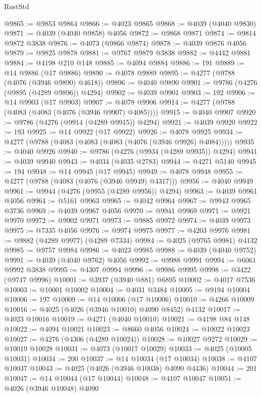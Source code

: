 \begin{lexlean}{RustStd}
\begin{coremodule}
@9865 := @9853 @9864
@9866 := @4023 @9865
@9868 := @4039 (@4040 @9830)
@9871 := @4039 (@4040 @9858) @4056
@9872 := @9868 @9871
@9874 := @9814 @9872 @3838
@9876 := @4073 (@9866 @9874)
@9878 := @4039 @9876 @4056
@9879 := @9825 @9878
@9881 := @9767 @9879 @3838
@9882 := @4442 @9881
@9884 := @4198 @210 @148
@9885 := @4094 @9884
@9886 := 191
@9889 := @14 @9886 (@17 @9886)
@9890 := @4078 @9889
@9895 := @4277 (@9788 (@4076 (@3946 @9890) @4618))
@9896 := @4040 @9890
@9901 := @9786 (@4276 (@9895 (@4289 @9896)) @4294)
@9902 := @4039 @9901
@9903 := 192
@9906 := @14 @9903 (@17 @9903)
@9907 := @4078 @9906
@9914 := @4277 (@9788 (@4083 (@4083 (@4076 (@3946 @9907) @4085))))
@9915 := @4040 @9907
@9920 := @9786 (@4276 (@9914 (@4289 @9915)) @4294)
@9921 := @4039 @9920
@9922 := 193
@9925 := @14 @9922 (@17 @9922)
@9926 := @4078 @9925
@9934 := @4277 (@9788 (@4083 (@4083 (@4083 (@4076 (@3946 @9926) @4084)))))
@9935 := @4040 @9926
@9940 := @9786 (@4276 (@9934 (@4289 @9935)) @4294)
@9941 := @4039 @9940
@9943 := @4034 (@4035 @2783)
@9944 := @4271 @5140
@9945 := 194
@9948 := @14 @9945 (@17 @9945)
@9949 := @4078 @9948
@9955 := @4277 (@9788 (@4083 (@4076 (@3946 @9949) @4317)))
@9956 := @4040 @9949
@9961 := @9944 (@4276 (@9955 (@4289 @9956)) @4294)
@9963 := @4039 @9961 @4056
@9964 := @5161 @9963
@9965 := @4042 @9964
@9967 := @9943 @9965 @3736
@9969 := @4039 @9967 @4056
@9970 := @9941 @9969
@9971 := @9921 @9970
@9972 := @9902 @9971
@9973 := @9885 @9972
@9974 := @4039 @9973
@9975 := @7335 @4056
@9976 := @9974 @9975
@9977 := @4203 @9976
@9981 := @9882 (@4289 @9977) (@4289 @7334)
@9984 := @4025 (@9765 @9981) @4132
@9985 := @9757 @9984
@9986 := @4023 @9985
@9988 := @4039 (@4040 @9752)
@9991 := @4039 (@4040 @9762) @4056
@9992 := @9988 @9991
@9994 := @6061 @9992 @3838
@9995 := @4307 @9994
@9996 := @9986 @9995
@9998 := @3422 (@9747 @9996)
@10001 := @3937 (@3940 @881) @6895
@10002 := @4017 @7536
@10003 := @10001 @10002
@10004 := @4031 @3484
@10005 := @9194 @10004
@10006 := 197
@10009 := @14 @10006 (@17 @10006)
@10010 := @4266 @10009
@10016 := @4025 (@4026 (@3946 @10010) @4090 @8452) @4132
@10017 := @4023 @10016
@10019 := @4271 (@4040 @10010)
@10021 := @4198 @84 @148
@10022 := @4094 @10021
@10023 := @8660 @4056
@10024 := @10022 @10023
@10027 := @4276 (@4306 (@4289 @10024))
@10028 := @10027 @9272
@10029 := @10019 @10028
@10031 := @4073 (@10017 @10029)
@10033 := @4025 (@10005 @10031)
@10034 := 200
@10037 := @14 @10034 (@17 @10034)
@10038 := @4107 @10037
@10043 := @4025 (@4026 (@3946 @10038) @4090 @4436)
@10044 := 201
@10047 := @14 @10044 (@17 @10044)
@10048 := @4107 @10047
@10051 := @4026 (@3946 @10048) @4090

\end{coremodule}
\end{lexlean}
